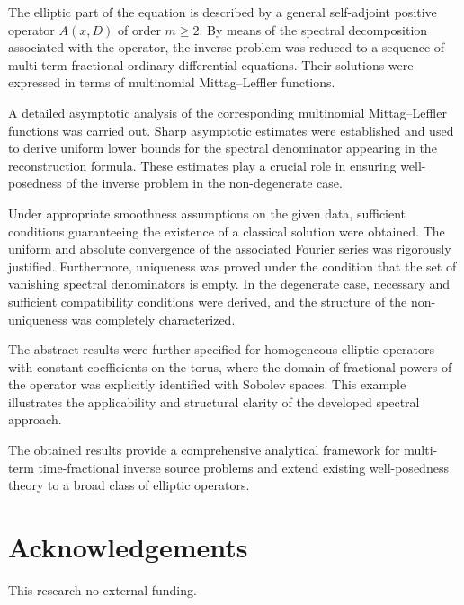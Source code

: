 \documentclass[12pt, reqno]{amsart}
\theoremstyle{definition}
\theoremstyle{remark}
\numberwithin{equation}{section}
\begin{document}
The elliptic part of the equation is described by a general 
self-adjoint positive operator $A(x,D)$ of order $m \ge 2$.  By means of the spectral decomposition associated with the operator, the inverse problem was reduced to a sequence of multi-term fractional ordinary differential equations. Their solutions were expressed in terms of multinomial Mittag--Leffler functions.

A detailed asymptotic analysis of the corresponding multinomial Mittag--Leffler functions was carried out. Sharp asymptotic estimates were established and used to derive uniform lower bounds for the spectral denominator appearing in the reconstruction formula. These estimates play a crucial role in ensuring well-posedness of the inverse problem in the non-degenerate case.

Under appropriate smoothness assumptions on the given data, sufficient conditions guaranteeing the existence of a classical solution were obtained. The uniform and absolute convergence of the associated Fourier series was rigorously justified. Furthermore, uniqueness was proved under the condition that the set of vanishing spectral denominators is empty. In the degenerate case, necessary and sufficient compatibility conditions were derived, and the structure of the non-uniqueness was completely characterized.

The abstract results were further specified for homogeneous elliptic operators with constant coefficients on the torus, where the domain of fractional powers of the operator was explicitly identified with Sobolev spaces. This example illustrates the applicability and structural clarity of the developed spectral approach.

The obtained results provide a comprehensive analytical framework for multi-term time-fractional inverse source problems and extend existing well-posedness theory to a broad class of elliptic operators.


\section*{Acknowledgements}
This research no external funding.
\end{document}

